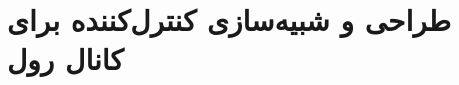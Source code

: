\documentclass{CCI2020}
\begin{document}
\section{طراحی و شبیه‌سازی کنترل‌کننده برای کانال رول}\label{roll_lqr_section_simulation}
%
%
\end{document}
